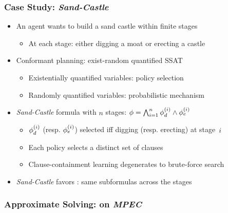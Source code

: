 \begin{frame}
    \frametitle{Case Study: \textit{Sand-Castle}}
    \begin{itemize}
        \item An agent wants to build a sand castle within finite stages
              \pause
              \begin{itemize}
                  \item At each stage: either digging a moat or erecting a castle
                        \pause
              \end{itemize}
        \item Conformant planning: exist-random quantified SSAT
              \pause
              \begin{itemize}
                  \item Existentially quantified variables: policy selection
                        \pause
                  \item Randomly quantified variables: probabilistic mechanism
                        \pause
              \end{itemize}
        \item \textit{Sand-Castle} formula with $n$ stages: $\phi=\bigwedge_{i=1}^n \phi_d^{(i)}\land\phi_e^{(i)}$
              \pause
              \begin{itemize}
                  \item $\phi_d^{(i)}$ (resp. $\phi_e^{(i)}$) selected iff digging (resp. erecting) at stage~$i$
                        \pause
                  \item Each policy selects a distinct set of clauses
                        \pause
                  \item Clause-containment learning degenerates to brute-force search
                        \pause
              \end{itemize}
        \item \textit{Sand-Castle} favors \dcssat: same subformulas  across the stages
    \end{itemize}
\end{frame}

\begin{frame}
    \frametitle{Approximate Solving: \erssat on \textit{MPEC}}
    \begin{table}[ht]
        \centering
        \scriptsize
    \end{table}
\end{frame}

